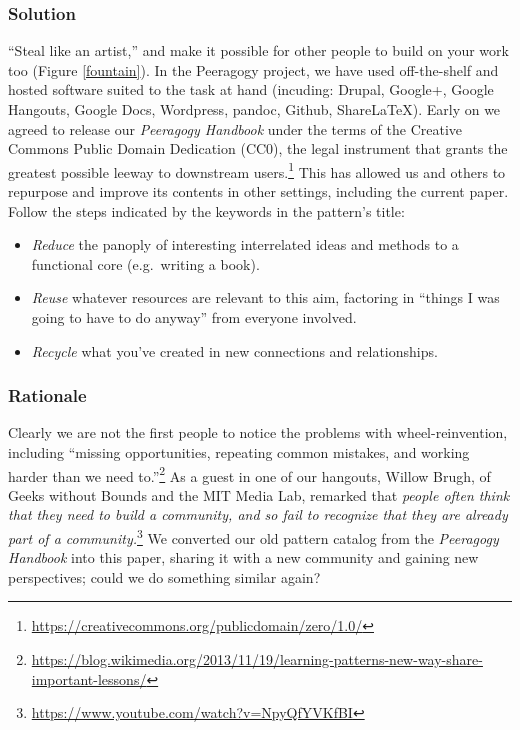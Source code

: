 \subsubsection*{Solution} ``Steal like an artist,'' and make it possible for other people to build on your work too (Figure \ref{fountain}).  In the Peeragogy project, we have used off-the-shelf and hosted software suited to the task at hand (incuding: Drupal, Google+, Google Hangouts, Google Docs, Wordpress, pandoc, Github, ShareLaTeX).  Early on we agreed to release our \emph{Peeragogy Handbook} under the terms of the Creative Commons Public Domain Dedication (CC0), the legal instrument that grants the greatest possible leeway to downstream users.\footnote{\url{https://creativecommons.org/publicdomain/zero/1.0/}}  This has allowed us and others to repurpose and improve its contents in other settings, including the current paper.  Follow the steps indicated by the keywords in the pattern's title: 
\vspace{-1mm}
\begin{itemize}
\item \emph{Reduce} the panoply of interesting interrelated ideas and methods to a functional core (e.g.~writing a book).
\item \emph{Reuse} whatever resources are relevant to this aim, factoring in ``things I was going to have to do anyway'' from everyone involved.
\item  \emph{Recycle} what you've created in new connections and relationships.
\end{itemize}

\subsubsection*{Rationale} 
Clearly we are not the first people to notice the problems with wheel-reinvention, including ``missing opportunities, repeating common mistakes, and working harder than we need to.''\footnote{\url{https://blog.wikimedia.org/2013/11/19/learning-patterns-new-way-share-important-lessons/}}  As a guest in  one of our hangouts, Willow Brugh, of Geeks without Bounds and the MIT Media Lab, remarked that \emph{people often think that they need to build a community, and so fail to recognize that they are already part of a community.}\footnote{\url{https://www.youtube.com/watch?v=NpyQfYVKfBI}}
We converted our old pattern catalog from the \emph{Peeragogy Handbook} into this paper, sharing it with a new community and gaining new perspectives; could we do something similar again?

